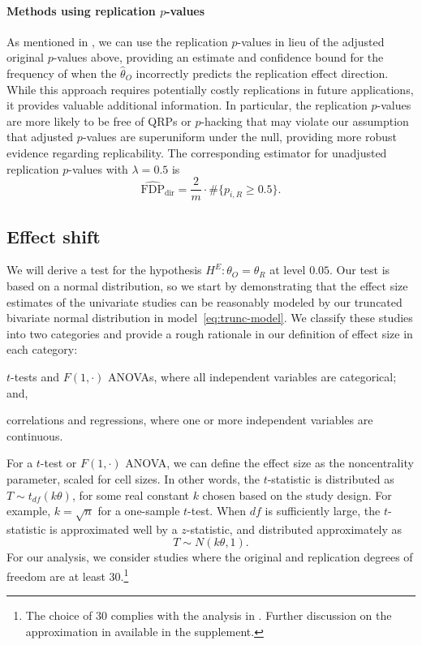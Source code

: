 \documentclass[11pt]{article}
\theoremstyle{definition}
\theoremstyle{custom}
\newcommand{\htheta}{\hat{\theta}}
\newcommand{\hFDPd}{\widehat{\text{FDP}}_\text{dir}}
\begin{document}
  \paragraph{Methods using replication $p$-values} As mentioned in , we can use the replication $p$-values in lieu of the adjusted original $p$-values above, providing an estimate and confidence bound for the frequency of when the $\htheta_O$ incorrectly predicts the replication effect direction. While this approach requires potentially costly replications in future applications, it provides valuable additional information. In particular, the replication $p$-values are more likely to be free of QRPs or $p$-hacking that may violate our assumption that adjusted $p$-values are superuniform under the null, providing more robust evidence regarding replicability. The corresponding estimator for unadjusted replication $p$-values with $\lambda= 0.5$ is 
  \[
    \hFDPd = \frac{2}{m} \cdot \#\{p_{i,R} \ge 0.5\}.
  \]

\subsection{Effect shift}

  We will derive a test for the hypothesis $H^E: \theta_O = \theta_R$ at level $0.05$. Our test is based on a normal distribution, so we start by demonstrating that the effect size estimates of the univariate studies can be reasonably modeled by our truncated bivariate normal distribution in model~\eqref{eq:trunc-model}. We classify these studies into two categories and provide a rough rationale in our definition of effect size in each category:
  \begin{inlinelist}
    \item $t$-tests and $F(1, \cdot)$ ANOVAs, where all independent variables are categorical; and,
    \item correlations and regressions, where one or more independent variables are continuous.
  \end{inlinelist}

  For a $t$-test or $F(1, \cdot)$ ANOVA, we can define the effect size as the noncentrality parameter, scaled for cell sizes. In other words, the $t$-statistic is distributed as $T \sim t_{df}(k\theta)$, for some real constant $k$ chosen based on the study design. For example, $k = \sqrt{n}$ for a one-sample $t$-test. When $df$ is sufficiently large, the $t$-statistic is approximated well by a $z$-statistic, and distributed approximately as
  \[
    T \sim N(k\theta, 1).
  \]
  For our analysis, we consider studies where the original and replication degrees of freedom are at least $30$.\footnote{The choice of $30$ complies with the analysis in \citet{Andrews:2018vh}. Further discussion on the approximation in available in the supplement.}
\end{document}
